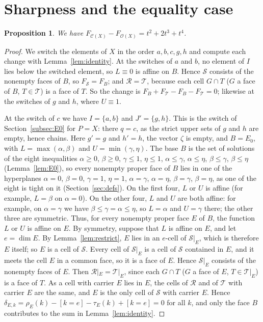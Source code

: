 \documentclass[11pt]{article}
\newtheorem{proposition}[theorem]{Proposition}
\theoremstyle{definition}
\theoremstyle{remark}
\newcommand{\OO}{\mathcal O}
\newcommand{\CC}{\mathcal C}
\newcommand{\SSS}{\mathcal S}
\newcommand{\TT}{\mathcal T}
\newcommand{\RR}{\mathcal R}
\begin{document}
\section{Sharpness and the equality case}\label{sec:sharp}
\begin{proposition}\label{prop:X} We have $F_{\CC(X)}-F_{\OO(X)}=t^2+2t^3+t^4$.
\end{proposition}
\begin{proof}
We switch the elements of $X$ in the order $a,b,c,g,h$ and compute each
change with Lemma~\ref{lem:identity}. At the switches of $a$ and $b$, no
element of $I$ lies below the switched element, so $L\equiv0$ is affine on $B$. Hence $\SSS$ consists of the nonempty faces of $B$, so $F_\SSS=F_B$; and $\RR=\TT$, because each cell $G\cap T$ ($G$ a face of $B$, $T\in\TT$) is a
face of $T$. So the change is $F_B+F_\TT-F_B-F_\TT=0$; likewise at the switches of $g$ and $h$, where $U\equiv1$.

At the switch of $c$ we have $I=\{a,b\}$ and $J'=\{g,h\}$. This is the switch of Section~\ref{subsec:E0} for
$P=X$: there $q=c$, as the strict upper sets of $g$ and $h$ are empty, hence chains. Here $g'=g$ and $h'=h$, the vector $\zeta$ is empty, and $B=E_0$, with $L=\max(\alpha,\beta)$ and $U=\min(\gamma,\eta)$.
The base $B$ is the set of solutions of the eight inequalities $\alpha\geq0$, $\beta\geq0$, $\gamma\leq1$, $\eta\leq1$,
$\alpha\leq\gamma$, $\alpha\leq\eta$, $\beta\leq\gamma$, $\beta\leq\eta$ (Lemma~\ref{lem:E0}), so every nonempty proper face of $B$ lies in one of the hyperplanes $\alpha=0$, $\beta=0$, $\gamma=1$, $\eta=1$, $\alpha=\gamma$, $\alpha=\eta$, $\beta=\gamma$, $\beta=\eta$, as one of the eight is tight on it (Section~\ref{sec:defs}). On the first four, $L$ or $U$ is affine (for example, $L=\beta$ on $\alpha=0$).
On the other four, $L$ and $U$ are both affine: for example, on $\alpha=\gamma$ we have
$\beta\leq\gamma=\alpha\leq\eta$, so $L=\alpha$ and $U=\gamma$ there; the other three are symmetric. Thus, for every nonempty proper face $E$ of $B$, the function $L$ or $U$ is affine on
$E$. By symmetry, suppose that $L$ is affine on $E$, and let $e=\dim E$. By Lemma~\ref{lem:restrict}, $E$ lies
in an $e$-cell of $\SSS|_E$, which is therefore $E$ itself; so $E$ is a cell of $\SSS$. Every cell of $\SSS|_E$
is a cell of $\SSS$ contained in $E$, and it meets the cell $E$ in a common face, so it is a face of $E$.
Hence $\SSS|_E$ consists of the nonempty faces of $E$. Then $\RR|_E=\TT|_E$, since
each $G\cap T$ ($G$ a face of $E$, $T\in\TT|_E$) is a face of $T$. As a cell with carrier $E$ lies in $E$, the cells of $\RR$ and of $\TT$ with carrier $E$ are the same, and $E$ is the only cell of $\SSS$ with carrier $E$. Hence $\delta_{E,k}=\rho_E(k)-[k=e]-\tau_E(k)+[k=e]=0$ for all $k$, and only the face $B$ contributes to the sum in Lemma~\ref{lem:identity}.


\end{proof}
\end{document}
